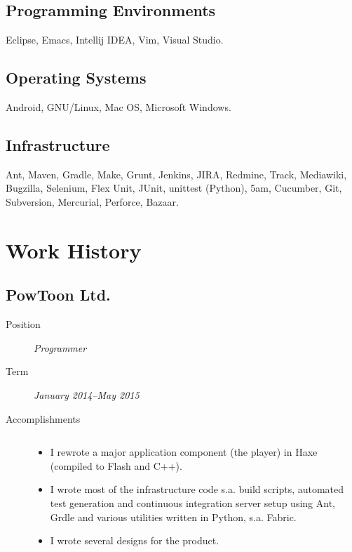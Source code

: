 \documentclass[11pt]{article}
\begin{document}
\subsection{Programming Environments}
\label{sec:orgheadline5}
Eclipse, Emacs, Intellij IDEA, Vim, Visual Studio.

\subsection{Operating Systems}
\label{sec:orgheadline6}
Android, GNU/Linux, Mac OS, Microsoft Windows.

\subsection{Infrastructure}
\label{sec:orgheadline7}
Ant, Maven, Gradle, Make, Grunt, Jenkins, JIRA, Redmine, Track, Mediawiki,
Bugzilla, Selenium, Flex Unit, JUnit, unittest (Python), 5am, Cucumber, Git,
Subversion, Mercurial, Perforce, Bazaar.

\clearpage

\section{Work History}
\label{sec:orgheadline12}

\subsection{PowToon Ltd.}
\label{sec:orgheadline9}
\begin{description}
\item[{Position}] \emph{Programmer}
\item[{Term}] \emph{January 2014--May 2015}
\item[{Accomplishments}] \(\;\)

\begin{itemize}
\item I rewrote a major application component (the player) in Haxe (compiled to
Flash and C++).
\item I wrote most of the infrastructure code s.a. build scripts, automated
test generation and continuous integration server setup using Ant, Grdle
and various utilities written in Python, s.a. Fabric.
\item I wrote several designs for the product.
\end{itemize}
\end{description}
\end{document}
